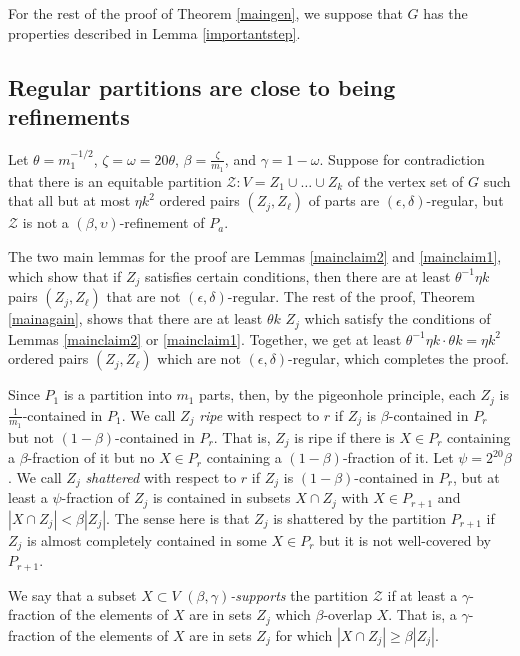 \documentclass[11pt]{article}
\begin{document}
For the rest of the proof of Theorem \ref{maingen}, we suppose that $G$ has the
properties described in
Lemma \ref{importantstep}.

\subsection{ Regular partitions are close to being refinements}

Let $\theta=m_1^{-1/2}$, $\zeta=\omega=20\theta$, $\beta = \frac{\zeta}{m_1}$,
and $\gamma = 1-\omega$. Suppose for
contradiction that there is an equitable partition $\mathcal{Z}:V=Z_1 \cup
\ldots
\cup Z_k$ of the vertex set of $G$ such that all but at most $\eta k^2$ ordered
pairs $(Z_j,Z_{\ell})$ of parts are $(\epsilon,\delta)$-regular, but
$\mathcal{Z}$ is not a $(\beta, \upsilon)$-refinement of $P_a$.

The two main lemmas for the proof are Lemmas \ref{mainclaim2} and
\ref{mainclaim1}, which show that if $Z_j$ satisfies certain conditions, then
there are at least $\theta^{-1}\eta k$ pairs $(Z_j,Z_{\ell})$ that are not
$(\epsilon,\delta)$-regular. The rest of the proof, Theorem \ref{mainagain},
shows that there are at least $\theta k$ $Z_j$ which satisfy the conditions of
Lemmas \ref{mainclaim2} or \ref{mainclaim1}. Together, we get at least
$\theta^{-1} \eta k \cdot \theta k = \eta k^2$ ordered pairs $(Z_j,Z_{\ell})$
which are not
$(\epsilon,\delta)$-regular, which completes the proof.

Since $P_1$ is a partition into $m_1$ parts, then, by the pigeonhole principle,
each $Z_j$ is
$\frac{1}{m_1}$-contained in $P_1$. We call $Z_j$ {\it ripe} with respect to
$r$
if $Z_j$ is $\beta$-contained in $P_r$ but not $(1-\beta)$-contained in
$P_{r}$. That is, $Z_j$ is ripe if there is $X \in P_r$ containing a
$\beta$-fraction of it but no $X \in P_r$ containing a $(1 - \beta)$-fraction
of it. Let $\psi=2^{20}\beta$. We call $Z_j$ {\it shattered} with respect to
$r$ if $Z_j$ is $(1-\beta)$-contained in $P_r$, but at least a $\psi$-fraction
of $Z_j$ is contained in subsets $X \cap Z_j$ with $X \in P_{r+1}$ and $|X \cap
Z_j| <\beta |Z_j|$. The sense here is that $Z_j$ is shattered by the partition
$P_{r+1}$ if $Z_j$ is almost completely contained in some $X \in P_r$ but it is
not well-covered by $P_{r+1}$.

We say that a subset $X \subset V$ {\it $(\beta,\gamma)$-supports} the
partition $\mathcal{Z}$ if at least a $\gamma$-fraction of the elements of $X$
are in sets $Z_j$ which $\beta$-overlap $X$. That is, a $\gamma$-fraction of
the elements of $X$ are in sets $Z_j$ for which $|X \cap Z_j| \geq \beta
|Z_j|$.
\end{document}
